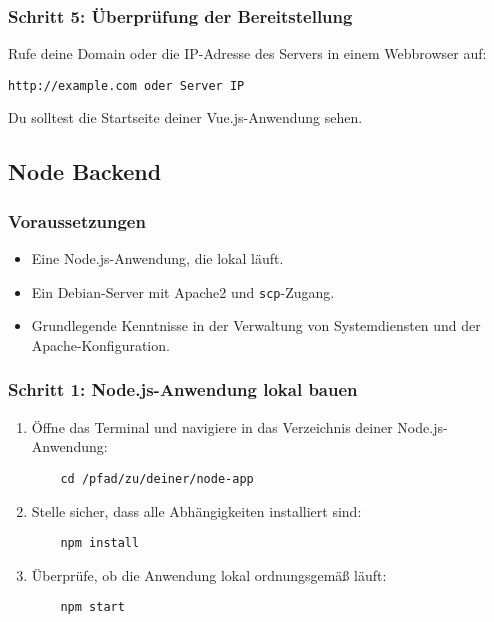 \documentclass[a4paper,12pt]{article}
\begin{document}
\subsubsection{Schritt 5: Überprüfung der Bereitstellung}
Rufe deine Domain oder die IP-Adresse des Servers in einem Webbrowser auf:

\begin{lstlisting}
http://example.com oder Server IP
\end{lstlisting}

Du solltest die Startseite deiner Vue.js-Anwendung sehen.



\subsection{Node Backend}
\subsubsection{Voraussetzungen}
\begin{itemize}
    \item Eine Node.js-Anwendung, die lokal läuft.
    \item Ein Debian-Server mit Apache2 und \texttt{scp}-Zugang.
    \item Grundlegende Kenntnisse in der Verwaltung von Systemdiensten und der Apache-Konfiguration.
\end{itemize}

\subsubsection{Schritt 1: Node.js-Anwendung lokal bauen}
\begin{enumerate}
    \item Öffne das Terminal und navigiere in das Verzeichnis deiner Node.js-Anwendung:
    
    \begin{lstlisting}
    cd /pfad/zu/deiner/node-app
    \end{lstlisting}
    
    \item Stelle sicher, dass alle Abhängigkeiten installiert sind:

    \begin{lstlisting}
    npm install
    \end{lstlisting}
    
    \item Überprüfe, ob die Anwendung lokal ordnungsgemäß läuft:

    \begin{lstlisting}
    npm start
    \end{lstlisting}
\end{enumerate}
\end{document}
